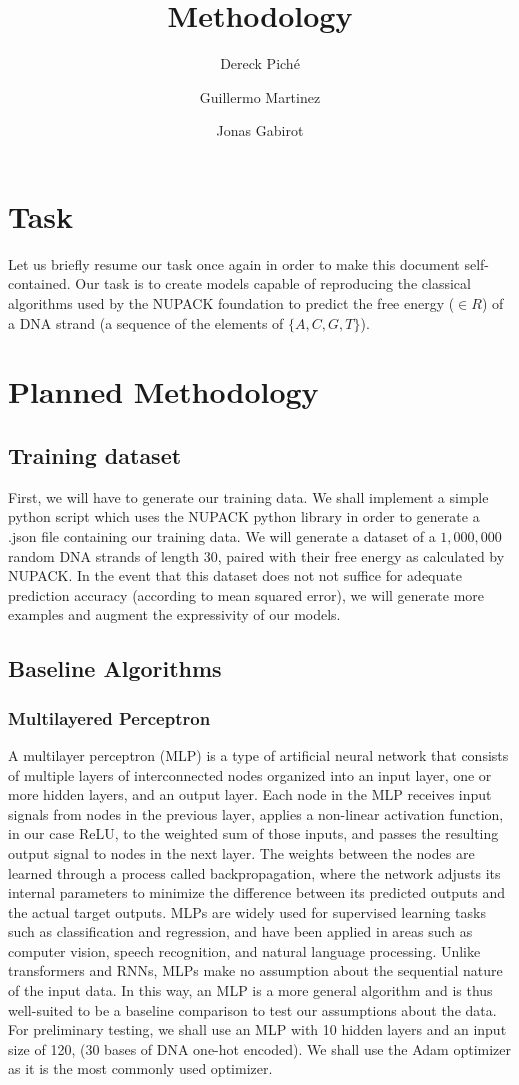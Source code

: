 \documentclass{article}
\title{Methodology}
\author
{
    Dereck Piché \and
    Guillermo Martinez \and
    Jonas Gabirot \and
}
\begin{document}
\maketitle

\section{Task}
Let us briefly resume our task once again in order to make this document
self-contained. Our task is to create models capable of reproducing 
the classical algorithms used by the NUPACK foundation to predict the 
free energy ($\in R$) of a DNA strand (a sequence of the elements of $\{A,C,G,T\}$).
\section{Planned Methodology}
\subsection{Training dataset}
First, we will have to generate our training data. We shall implement a 
simple python script which uses the NUPACK python library in order
to generate a .json file containing our training data. We  
will generate a dataset of a $1,000,000$ random DNA strands of length $30$, paired with their free energy as calculated by NUPACK. In the event that this dataset does not not
suffice for adequate prediction accuracy (according to mean squared error), we will
generate more examples and augment the expressivity of our models.
\subsection{Baseline Algorithms}

\subsubsection{Multilayered Perceptron}
A multilayer perceptron (MLP) is a type of artificial neural network that consists of multiple layers of interconnected nodes organized into an input layer, one or more hidden layers, and an output layer. Each node in the MLP receives input signals from nodes in the previous layer, applies a non-linear activation function, in our case ReLU, to the weighted sum of those inputs, and passes the resulting output signal to nodes in the next layer. The weights between the nodes are learned through a process called backpropagation, where the network adjusts its internal parameters to minimize the difference between its predicted outputs and the actual target outputs. MLPs are widely used for supervised learning tasks such as classification and regression, and have been applied in areas such as computer vision, speech recognition, and natural language processing. Unlike transformers and RNNs, MLPs make no assumption about the sequential nature of the input data. In this way, an MLP is a more general algorithm and is thus well-suited to be a baseline comparison to test our assumptions about the data. For preliminary testing, we shall use an MLP with 10 hidden layers and an input size of 120, (30 bases of DNA one-hot encoded). We shall use the Adam optimizer as it is the most commonly used optimizer.
\end{document}
